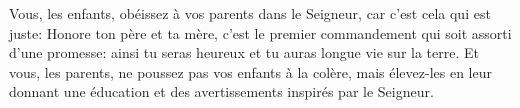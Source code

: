 Vous, les enfants, obéissez à vos parents dans le Seigneur,
	car c’est cela qui est juste:
	Honore ton père et ta mère,
	c’est le premier commandement qui soit assorti d’une promesse:
	ainsi tu seras heureux et tu auras longue vie sur la terre.
Et vous, les parents, ne poussez pas vos enfants à la colère,
	mais élevez-les en leur donnant une éducation
		et des avertissements inspirés par le Seigneur.
